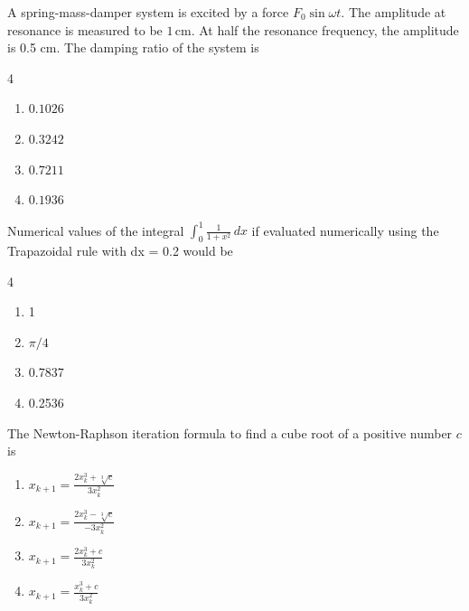     \item A spring-mass-damper system is excited by a force $F_0 \sin \omega t$. The amplitude at resonance is measured to be $1 \, \mathrm{cm}$. At half the resonance frequency, the amplitude is 0.5 cm. The damping ratio of the system is 
    \begin{multicols}{4}
    \begin{enumerate}
        \item $0.1026$ \quad
        \item $0.3242$ \quad
        \item $0.7211$ \quad
        \item $0.1936$
    \end{enumerate}
    \end{multicols}
    \item Numerical values of the integral 
    $\int_{0}^{1} \frac{1}{1 + x^2}\,dx$ if evaluated numerically using the Trapazoidal rule with dx = 0.2 would be
    \begin{multicols}{4}
    \begin{enumerate}
        \item 1
        \item $\pi/4$
        \item 0.7837
        \item 0.2536
    \end{enumerate}
    \end{multicols}
    \item The Newton-Raphson iteration formula to find a cube root of a positive number $c$ is
    \begin{enumerate}
        \item $x_{k+1} = \frac{2 x_k^3 + \sqrt[3]{c}}{3 x_k^2}$
        \item $x_{k+1} = \frac{2 x_k^3 - \sqrt[3]{c}}{-3 x_k^2}$
        \item $x_{k+1} = \frac{2 x_k^3 + c}{3 x_k^2}$
        \item $x_{k+1} = \frac{x_k^3 + c}{3 x_k^2}$
    \end{enumerate}

